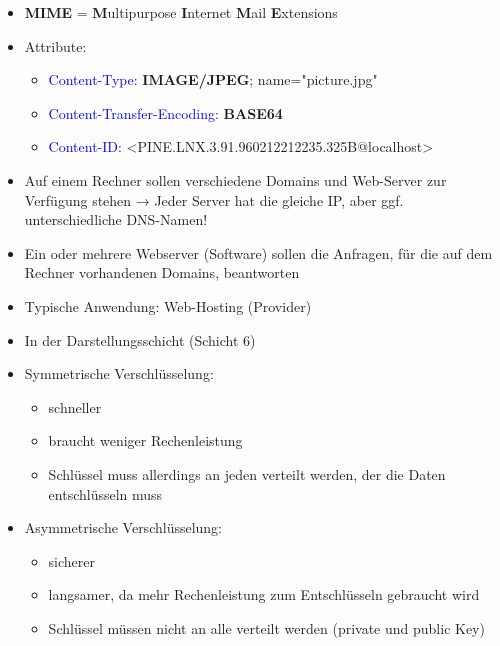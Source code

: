 \begin{itemize}
    \item \textbf{MIME} = \textbf{M}ultipurpose \textbf{I}nternet \textbf{M}ail \textbf{E}xtensions
    \item Attribute:
    \begin{itemize}
        \item \textcolor{blue}{Content-Type:} \textbf{IMAGE/JPEG}; name="picture.jpg"
        \item \textcolor{blue}{Content-Transfer-Encoding:} \textbf{BASE64}
        \item \textcolor{blue}{Content-ID:} <PINE.LNX.3.91.960212212235.325B@localhost>
    \end{itemize}
\end{itemize}

\begin{itemize}
    \item Auf einem Rechner sollen verschiedene Domains und Web-Server zur Verfügung stehen → Jeder Server hat die gleiche IP, aber ggf. unterschiedliche DNS-Namen!
    \item Ein oder mehrere Webserver (Software) sollen die Anfragen, für die auf dem Rechner vorhandenen Domains, beantworten
    \item Typische Anwendung: Web-Hosting (Provider)
\end{itemize}

\begin{itemize}
    \item In der Darstellungsschicht (Schicht 6)
\end{itemize}

\begin{itemize}
    \item Symmetrische Verschlüsselung:
    \begin{itemize}
        \item schneller
        \item braucht weniger Rechenleistung
        \item Schlüssel muss allerdings an jeden verteilt werden, der die Daten entschlüsseln muss
    \end{itemize}
    \item Asymmetrische Verschlüsselung:
    \begin{itemize}
        \item sicherer
        \item langsamer, da mehr Rechenleistung zum Entschlüsseln gebraucht wird
        \item Schlüssel müssen nicht an alle verteilt werden (private und public Key)
    \end{itemize}
\end{itemize}

